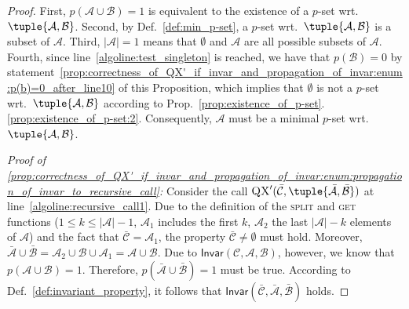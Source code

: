 \documentclass[]{elsarticle}
\newcommand{\scQX}{{\textsc{QX}}}
\newcommand{\ma}{\mathcal{A}}
\newcommand{\mb}{\mathcal{B}}
\newcommand{\mc}{\mathcal{C}}
\newcommand{\ba}{\bar{\ma}}
\newcommand{\bb}{\bar{\mb}}
\newcommand{\bc}{\bar{\mc}}
\newcommand{\Inv}{\mathsf{Invar}}
\begin{document}
\begin{proof}
		First, $p(\ma\cup\mb)=1$ is equivalent to the existence of a $p$-set wrt.\ $\tuple{\ma,\mb}$. Second, by Def.~\ref{def:min_p-set}, a $p$-set wrt.\ $\tuple{\ma,\mb}$ is a subset of $\ma$. Third, $|\ma|=1$ means that $\emptyset$ and $\ma$ are all possible subsets of $\ma$. 
		Fourth, since line~\ref{algoline:test_singleton} is reached, we have that $p(\mb)=0$ by statement~\ref{prop:correctness_of_QX'_if_invar_and_propagation_of_invar:enum:p(b)=0_after_line10} of this Proposition, which implies that $\emptyset$ is not a $p$-set wrt.\ $\tuple{\ma,\mb}$ according to Prop.~\ref{prop:existence_of_p-set}.\ref{prop:existence_of_p-set:2}. Consequently, $\ma$ must be a minimal $p$-set wrt.\ $\tuple{\ma,\mb}$.
		\vspace{5pt}
		
		\noindent\emph{Proof of \ref{prop:correctness_of_QX'_if_invar_and_propagation_of_invar:enum:propagation_of_invar_to_recursive_call}:} 
		Consider the call $\scQX'(\bc,\tuple{\ba,\bb})$ at line~\ref{algoline:recursive_call1}. Due to the definition of the \textsc{split} and \textsc{get} functions ($1\leq k \leq |\ma|-1$, $\ma_1$ includes the first $k$, $\ma_2$ the last $|\ma|-k$ elements of $\ma$) and the fact that $\bc = \ma_1$, the property $\bc \neq \emptyset$ must hold. Moreover, $\ba\cup\bb = \ma_2\cup\mb\cup\ma_1 = \ma\cup\mb$. Due to $\Inv(\mc,\ma,\mb)$, however, we know that $p(\ma\cup\mb)=1$. Therefore, $p(\ba\cup\bb)=1$ must be true. According to Def.~\ref{def:invariant_property}, it follows that $\Inv(\bc,\ba,\bb)$ holds.
	\end{proof}
\end{document}
